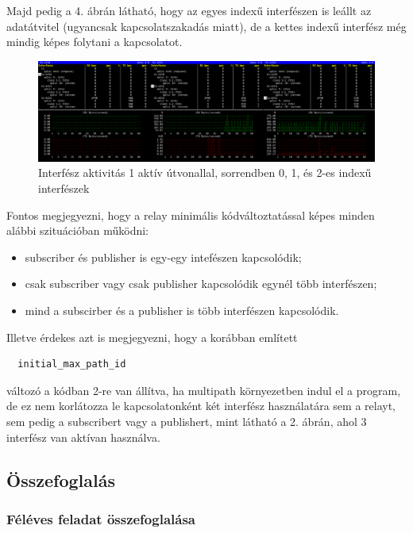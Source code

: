 \documentclass[a4paper,oneside]{article}
\begin{document}
Majd pedig a 4. ábrán látható, hogy az egyes indexű interfészen is leállt az adatátvitel (ugyancsak 
kapcsolatszakadás miatt), de a kettes indexű interfész még mindig képes folytani a kapcsolatot.

\begin{figure}[h]
  \centering
    \hspace*{-1.5cm}%
    \includegraphics[width=18cm]{bmon3}
\caption{Interfész aktivitás 1 aktív útvonallal, sorrendben 0, 1, és 2-es indexű interfészek}
\end{figure}

Fontos megjegyezni, hogy a relay minimális kódváltoztatással képes minden alábbi szituációban működni:
\begin{itemize}
  \item subscriber és publisher is egy-egy intefészen kapcsolódik;
  \item csak subscriber vagy csak publisher kapcsolódik egynél több interfészen;
  \item mind a subscirber és a publisher is több interfészen kapcsolódik.
\end{itemize}

Illetve érdekes azt is megjegyezni, hogy a korábban említett 
\begin{verbatim}
  initial_max_path_id
\end{verbatim}
változó a kódban 2-re van állítva, ha multipath környezetben indul el a program,
de ez nem korlátozza le kapcsolatonként két interfész használatára sem a relayt, sem pedig a 
subscribert vagy a publishert, mint látható a 2. ábrán, ahol 3 interfész van aktívan használva.

\subsection{Összefoglalás}
\label{sec:osszefoglalas}

\subsubsection{Féléves feladat összefoglalása}
\end{document}
